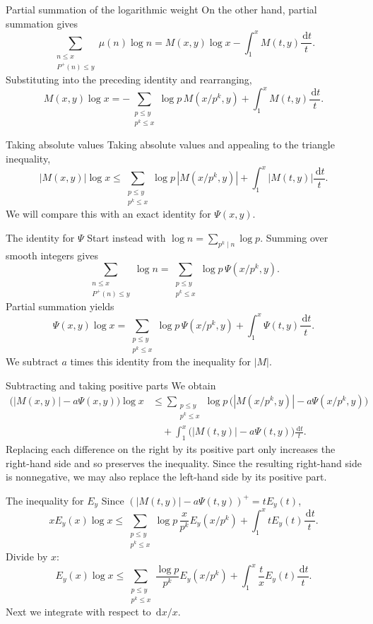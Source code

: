 \documentclass[aspectratio=169,11pt]{beamer}
\newcommand{\dd}{\,\mathrm d}
\begin{document}
\begin{frame}{Partial summation of the logarithmic weight}
On the other hand, partial summation gives
\[\sum_{\substack{n\le x\\P^+(n)\le y}}\mu(n)\log n
=M(x,y)\log x-\int_1^x M(t,y)\frac{\dd t}t.\]
Substituting into the preceding identity and rearranging,
\[M(x,y)\log x=-\sum_{\substack{p\le y\\p^k\le x}}\log p\,M(x/p^k,y)
+\int_1^x M(t,y)\frac{\dd t}t.\]
\end{frame}
\begin{frame}{Taking absolute values}
Taking absolute values and appealing to the triangle inequality,
\[|M(x,y)|\log x\le\sum_{\substack{p\le y\\p^k\le x}}\log p\,|M(x/p^k,y)|
+\int_1^x|M(t,y)|\frac{\dd t}t.\]
We will compare this with an exact identity for $\Psi(x,y)$.
\end{frame}
\begin{frame}{The identity for $\Psi$}
Start instead with $\log n=\sum_{p^k\mid n}\log p$. Summing over smooth integers gives
\[\sum_{\substack{n\le x\\P^+(n)\le y}}\log n
=\sum_{\substack{p\le y\\p^k\le x}}\log p\,\Psi(x/p^k,y).\]
Partial summation yields
\[\Psi(x,y)\log x=\sum_{\substack{p\le y\\p^k\le x}}\log p\,\Psi(x/p^k,y)
+\int_1^x\Psi(t,y)\frac{\dd t}t.\]
We subtract $a$ times this identity from the inequality for $|M|$.
\end{frame}
\begin{frame}{Subtracting and taking positive parts}
\small
We obtain
\begin{align*}
\bigl(|M(x,y)|-a\Psi(x,y)\bigr)\log x
&\le\sum_{\substack{p\le y\\p^k\le x}}\log p\,
\bigl(|M(x/p^k,y)|-a\Psi(x/p^k,y)\bigr)\\
&\quad+\int_1^x\bigl(|M(t,y)|-a\Psi(t,y)\bigr)\frac{\dd t}t.
\end{align*}
Replacing each difference on the right by its positive part only increases the right-hand side and so preserves the inequality. Since the resulting right-hand side is nonnegative, we may also replace the left-hand side by its positive part.
\end{frame}
\begin{frame}{The inequality for $E_y$}
Since $(|M(t,y)|-a\Psi(t,y))^+=tE_y(t)$,
\[xE_y(x)\log x\le\sum_{\substack{p\le y\\p^k\le x}}\log p\,\frac{x}{p^k}E_y(x/p^k)
+\int_1^x tE_y(t)\frac{\dd t}t.\]
Divide by $x$:
\[E_y(x)\log x\le\sum_{\substack{p\le y\\p^k\le x}}\frac{\log p}{p^k}E_y(x/p^k)
+\int_1^x\frac tx E_y(t)\frac{\dd t}t.\]
Next we integrate with respect to $\dd x/x$.
\end{frame}
\end{document}
